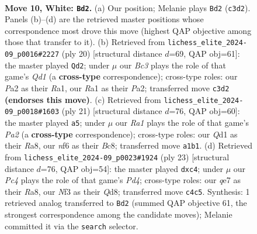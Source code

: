 \documentclass[11pt]{article}
\begin{document}
\clearpage

\begin{figure}[p]\centering
\begin{subfigure}{0.46\textwidth}\centering
\resizebox{\linewidth}{!}{%
\newchessgame
\chessboard[
  setfen={r1b1r1k1/ppp1qppp/2n1pn2/3p4/2PP3P/2B1PNP1/PP3P2/R2QKB1R w KQ - 0 10},
  showmover=false,
  pgfstyle=straightmove, color=movearrow, markmove={c3-d2}
]}
\caption{}
\end{subfigure}\hfill
\begin{subfigure}{0.46\textwidth}\centering
\resizebox{\linewidth}{!}{%
\newchessgame
\chessboard[
  setfen={r1b2rk1/ppp1qpp1/2np1n1p/4p3/2PPP3/1NP1BP2/P5PP/R2QKB1R w KQ - 4 11},
  showmover=false,
  pgfstyle=straightmove, color=movearrow, markmove={d1-d2}
]}
\caption{}
\end{subfigure}
\\[4pt]
\begin{subfigure}{0.46\textwidth}\centering
\resizebox{\linewidth}{!}{%
\newchessgame
\chessboard[
  setfen={r1b2rk1/ppq1bppp/2pp1n2/4p3/P2PP3/2N2N1P/1PP2PP1/R1BQR1K1 b - - 2 11},
  showmover=false,
  pgfstyle=straightmove, color=movearrow, markmove={a7-a5}
]}
\caption{}
\end{subfigure}\hfill
\begin{subfigure}{0.46\textwidth}\centering
\resizebox{\linewidth}{!}{%
\newchessgame
\chessboard[
  setfen={r1bqk2r/p3n1bp/2p1p1p1/3pPp2/N1P2P2/5N2/PPP3PP/R1B1QRK1 b kq - 0 12},
  showmover=false,
  pgfstyle=straightmove, color=movearrow, markmove={d5-c4}
]}
\caption{}
\end{subfigure}
\caption{\textbf{Move 10, White: \texttt{Bd2}.} (a) Our position; Melanie plays \texttt{Bd2} (\texttt{c3d2}). Panels (b)--(d) are the retrieved master positions whose correspondence most drove this move (highest QAP objective among those that transfer to it). (b) Retrieved from \texttt{lichess\_elite\_2024-09\_p0016\#2227} (ply 20) [structural distance $d$=69, QAP obj=61]: the master played \texttt{Qd2}; under $\mu$ our \emph{Bc3} plays the role of that game's \emph{Qd1} (a \textbf{cross-type} correspondence); cross-type roles: our \emph{P}a2 as their \emph{R}a1, our \emph{R}a1 as their \emph{P}a2; transferred move \texttt{c3d2} \textbf{(endorses this move)}. (c) Retrieved from \texttt{lichess\_elite\_2024-09\_p0018\#1603} (ply 21) [structural distance $d$=76, QAP obj=60]: the master played \texttt{a5}; under $\mu$ our \emph{Ra1} plays the role of that game's \emph{Pa2} (a \textbf{cross-type} correspondence); cross-type roles: our \emph{Q}d1 as their \emph{R}a8, our \emph{n}f6 as their \emph{B}c8; transferred move \texttt{a1b1}. (d) Retrieved from \texttt{lichess\_elite\_2024-09\_p0023\#1924} (ply 23) [structural distance $d$=76, QAP obj=54]: the master played \texttt{dxc4}; under $\mu$ our \emph{Pc4} plays the role of that game's \emph{Pd4}; cross-type roles: our \emph{q}e7 as their \emph{R}a8, our \emph{N}f3 as their \emph{Q}d8; transferred move \texttt{c4c5}. Synthesis: 1 retrieved analog transferred to \texttt{Bd2} (summed QAP objective 61, the strongest correspondence among the candidate moves); Melanie committed it via the \texttt{search} selector.}
\label{fig:thought-m18}
\end{figure}
\end{document}
